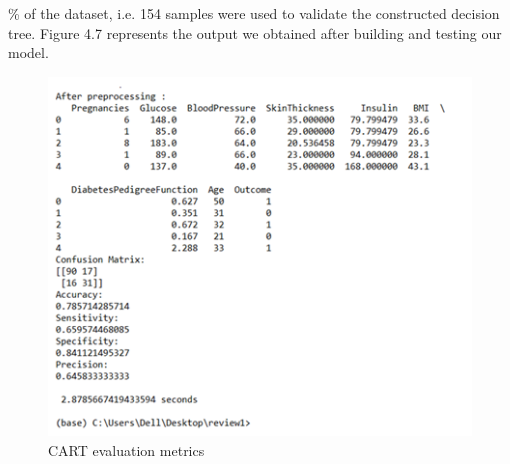 \% of the dataset, i.e. 154 samples were used to validate the constructed decision tree. Figure 4.7 represents the output we obtained after building and testing our model.
\begin{figure}[h]
\centering
\includegraphics[scale=1.4]{carteval.PNG}
\caption{\label{fig:subBDDs1}CART evaluation metrics}
\end{figure}

\newpage
